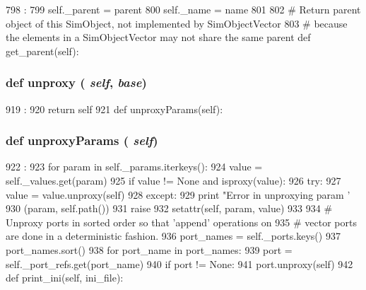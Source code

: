 \begin{DoxyCode}
798                                       :
799         self._parent = parent
800         self._name = name
801 
802     # Return parent object of this SimObject, not implemented by SimObjectVector
803     # because the elements in a SimObjectVector may not share the same parent
    def get_parent(self):
\end{DoxyCode}
\hypertarget{classm5_1_1SimObject_1_1SimObject_a587cd3c1e899640dc09d63793aa8093b}{
\subsubsection[{unproxy}]{\setlength{\rightskip}{0pt plus 5cm}def unproxy ( {\em self}, \/   {\em base})}}
\label{classm5_1_1SimObject_1_1SimObject_a587cd3c1e899640dc09d63793aa8093b}



\begin{DoxyCode}
919                            :
920         return self
921 
    def unproxyParams(self):
\end{DoxyCode}
\hypertarget{classm5_1_1SimObject_1_1SimObject_a9614f96d6a5887ab81dad6e0c2a7dc48}{
\subsubsection[{unproxyParams}]{\setlength{\rightskip}{0pt plus 5cm}def unproxyParams ( {\em self})}}
\label{classm5_1_1SimObject_1_1SimObject_a9614f96d6a5887ab81dad6e0c2a7dc48}



\begin{DoxyCode}
922                            :
923         for param in self._params.iterkeys():
924             value = self._values.get(param)
925             if value != None and isproxy(value):
926                 try:
927                     value = value.unproxy(self)
928                 except:
929                     print "Error in unproxying param '%
930                           (param, self.path())
931                     raise
932                 setattr(self, param, value)
933 
934         # Unproxy ports in sorted order so that 'append' operations on
935         # vector ports are done in a deterministic fashion.
936         port_names = self._ports.keys()
937         port_names.sort()
938         for port_name in port_names:
939             port = self._port_refs.get(port_name)
940             if port != None:
941                 port.unproxy(self)
942 
    def print_ini(self, ini_file):
\end{DoxyCode}


